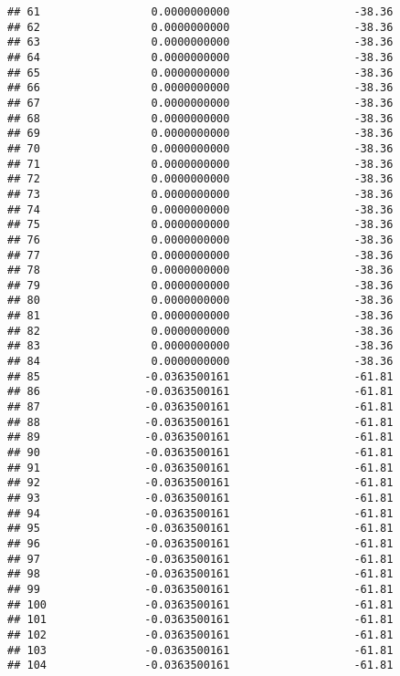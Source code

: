 \documentclass[]{article}
\begin{document}
\begin{verbatim}
## 61                 0.0000000000                   -38.36
## 62                 0.0000000000                   -38.36
## 63                 0.0000000000                   -38.36
## 64                 0.0000000000                   -38.36
## 65                 0.0000000000                   -38.36
## 66                 0.0000000000                   -38.36
## 67                 0.0000000000                   -38.36
## 68                 0.0000000000                   -38.36
## 69                 0.0000000000                   -38.36
## 70                 0.0000000000                   -38.36
## 71                 0.0000000000                   -38.36
## 72                 0.0000000000                   -38.36
## 73                 0.0000000000                   -38.36
## 74                 0.0000000000                   -38.36
## 75                 0.0000000000                   -38.36
## 76                 0.0000000000                   -38.36
## 77                 0.0000000000                   -38.36
## 78                 0.0000000000                   -38.36
## 79                 0.0000000000                   -38.36
## 80                 0.0000000000                   -38.36
## 81                 0.0000000000                   -38.36
## 82                 0.0000000000                   -38.36
## 83                 0.0000000000                   -38.36
## 84                 0.0000000000                   -38.36
## 85                -0.0363500161                   -61.81
## 86                -0.0363500161                   -61.81
## 87                -0.0363500161                   -61.81
## 88                -0.0363500161                   -61.81
## 89                -0.0363500161                   -61.81
## 90                -0.0363500161                   -61.81
## 91                -0.0363500161                   -61.81
## 92                -0.0363500161                   -61.81
## 93                -0.0363500161                   -61.81
## 94                -0.0363500161                   -61.81
## 95                -0.0363500161                   -61.81
## 96                -0.0363500161                   -61.81
## 97                -0.0363500161                   -61.81
## 98                -0.0363500161                   -61.81
## 99                -0.0363500161                   -61.81
## 100               -0.0363500161                   -61.81
## 101               -0.0363500161                   -61.81
## 102               -0.0363500161                   -61.81
## 103               -0.0363500161                   -61.81
## 104               -0.0363500161                   -61.81

\end{verbatim}
\end{document}

